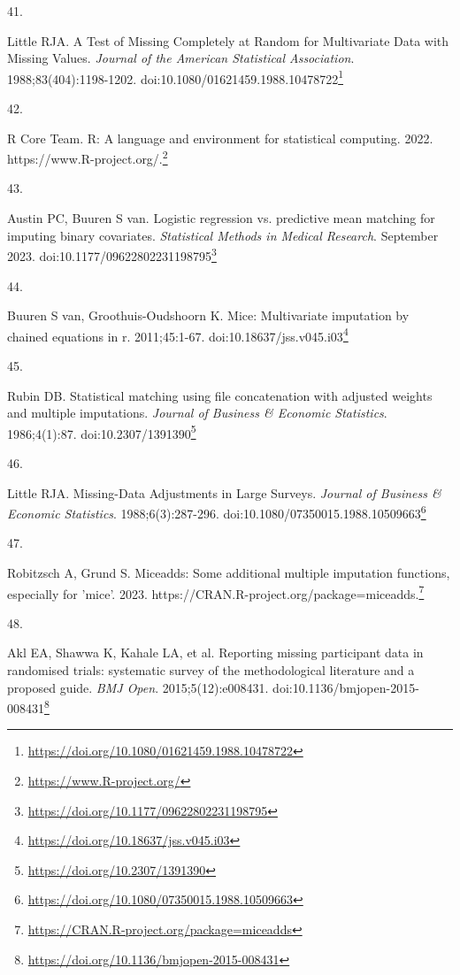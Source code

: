 \documentclass[
  a4paper,
]{book}
\newlength{\cslhangindent}
\newlength{\csllabelwidth}
\newlength{\cslentryspacingunit} %
\newenvironment{CSLReferences}[2] %
 {%
  \setlength{\parindent}{0pt}
  \ifodd #1
  \let\oldpar\par
  \def\par{\hangindent=\cslhangindent\oldpar}
  \fi
  \setlength{\parskip}{#2\cslentryspacingunit}
 }%
 {}
\newcommand{\CSLLeftMargin}[1]{\parbox[t]{\csllabelwidth}{#1}}
\newcommand{\CSLRightInline}[1]{\parbox[t]{\linewidth - \csllabelwidth}{#1}\break}
\renewcommand{\href}[2]{#2\footnote{\url{#1}}}
\begin{document}
\begin{CSLReferences}{0}{0}
\leavevmode{}%
\CSLLeftMargin{41. }%
\CSLRightInline{Little RJA. A Test of Missing Completely at Random for Multivariate Data with Missing Values. \emph{Journal of the American Statistical Association}. 1988;83(404):1198-1202. doi:\href{https://doi.org/10.1080/01621459.1988.10478722}{10.1080/01621459.1988.10478722}}

\leavevmode{}%
\CSLLeftMargin{42. }%
\CSLRightInline{R Core Team. R: A language and environment for statistical computing. 2022. \href{https://www.R-project.org/}{https://www.R-project.org/.}}

\leavevmode{}%
\CSLLeftMargin{43. }%
\CSLRightInline{Austin PC, Buuren S van. Logistic regression vs. predictive mean matching for imputing binary covariates. \emph{Statistical Methods in Medical Research}. September 2023. doi:\href{https://doi.org/10.1177/09622802231198795}{10.1177/09622802231198795}}

\leavevmode{}%
\CSLLeftMargin{44. }%
\CSLRightInline{Buuren S van, Groothuis-Oudshoorn K. {\textbraceleft}Mice{\textbraceright}: Multivariate imputation by chained equations in r. 2011;45:1-67. doi:\href{https://doi.org/10.18637/jss.v045.i03}{10.18637/jss.v045.i03}}

\leavevmode{}%
\CSLLeftMargin{45. }%
\CSLRightInline{Rubin DB. Statistical matching using file concatenation with adjusted weights and multiple imputations. \emph{Journal of Business \& Economic Statistics}. 1986;4(1):87. doi:\href{https://doi.org/10.2307/1391390}{10.2307/1391390}}

\leavevmode{}%
\CSLLeftMargin{46. }%
\CSLRightInline{Little RJA. Missing-Data Adjustments in Large Surveys. \emph{Journal of Business \& Economic Statistics}. 1988;6(3):287-296. doi:\href{https://doi.org/10.1080/07350015.1988.10509663}{10.1080/07350015.1988.10509663}}

\leavevmode{}%
\CSLLeftMargin{47. }%
\CSLRightInline{Robitzsch A, Grund S. Miceadds: Some additional multiple imputation functions, especially for 'mice'. 2023. \href{https://CRAN.R-project.org/package=miceadds}{https://CRAN.R-project.org/package=miceadds.}}

\leavevmode{}%
\CSLLeftMargin{48. }%
\CSLRightInline{Akl EA, Shawwa K, Kahale LA, et al. Reporting missing participant data in randomised trials: systematic survey of the methodological literature and a proposed guide. \emph{BMJ Open}. 2015;5(12):e008431. doi:\href{https://doi.org/10.1136/bmjopen-2015-008431}{10.1136/bmjopen-2015-008431}}


\end{CSLReferences}
\end{document}
